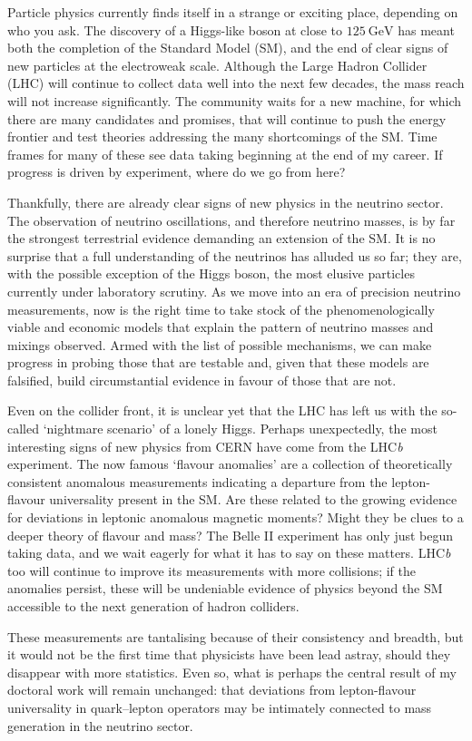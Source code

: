 \begin{preface}
  Particle physics currently finds itself in a strange or exciting place,
  depending on who you ask. The discovery of a Higgs-like boson at close to
  $\SI{125}{\GeV}$ has meant both the completion of the Standard Model (SM), and
  the end of clear signs of new particles at the electroweak scale. Although the
  Large Hadron Collider (LHC) will continue to collect data well into the next
  few decades, the mass reach will not increase significantly. The community
  waits for a new machine, for which there are many candidates and promises,
  that will continue to push the energy frontier and test theories addressing
  the many shortcomings of the SM. Time frames for many of these see data taking
  beginning at the end of my career. If progress is driven by experiment, where
  do we go from here?

  Thankfully, there are already clear signs of new physics in the neutrino
  sector. The observation of neutrino oscillations, and therefore neutrino
  masses, is by far the strongest terrestrial evidence demanding an extension of
  the SM. It is no surprise that a full understanding of the neutrinos has
  alluded us so far; they are, with the possible exception of the Higgs boson,
  the most elusive particles currently under laboratory scrutiny. As we move
  into an era of precision neutrino measurements, now is the right time to take
  stock of the phenomenologically viable and economic models that explain the
  pattern of neutrino masses and mixings observed. Armed with the list of
  possible mechanisms, we can make progress in probing those that are testable
  and, given that these models are falsified, build circumstantial evidence in
  favour of those that are not.

  Even on the collider front, it is unclear yet that the LHC has left us with
  the so-called `nightmare scenario' of a lonely Higgs. Perhaps unexpectedly,
  the most interesting signs of new physics from CERN have come from the
  LHC\textit{b} experiment. The now famous `flavour anomalies' are a collection
  of theoretically consistent anomalous measurements indicating a departure from
  the lepton-flavour universality present in the SM. Are these related to the
  growing evidence for deviations in leptonic anomalous magnetic moments? Might
  they be clues to a deeper theory of flavour and mass? The Belle II experiment
  has only just begun taking data, and we wait eagerly for what it has to say on
  these matters. LHC\textit{b} too will continue to improve its measurements
  with more collisions; if the anomalies persist, these will be undeniable
  evidence of physics beyond the SM accessible to the next generation of hadron
  colliders.

  These measurements are tantalising because of their consistency and breadth,
  but it would not be the first time that physicists have been lead astray,
  should they disappear with more statistics. Even so, what is perhaps the
  central result of my doctoral work will remain unchanged: that deviations from
  lepton-flavour universality in quark--lepton operators may be intimately
  connected to mass generation in the neutrino sector.

\end{preface}
